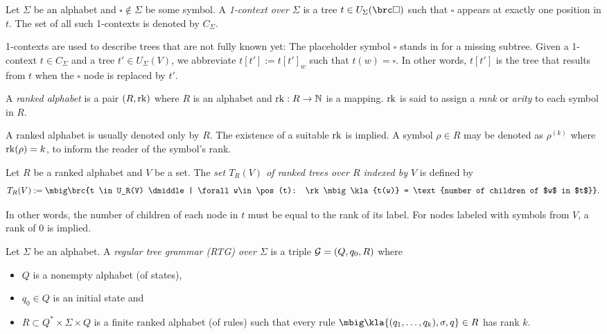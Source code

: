 \begin{definition}
 Let $\Sigma$ be an alphabet and $\square\notin\Sigma$ be some symbol. A
 \emph{1-context over $\Sigma$} is a tree $t\in U_\Sigma(\brc\square)$ such
 that $\square$ appears at exactly one position in $t$. The set of all such
 1-contexts is denoted by $C_\Sigma$.
\end{definition}

1-contexts are used to describe trees that are not fully known yet: The
placeholder symbol $\square$ stands in for a missing subtree. Given a 1-context
$t\in C_\Sigma$ and a tree $t'\in U_\Sigma(V)$, we abbreviate $t[t'] :=
t[t']_w$ such that $t(w) = \square$. In other words, $t[t']$ is the tree that
results from $t$ when the $\square$ node is replaced by $t'$.

\begin{definition}
 A \emph{ranked alphabet} is a pair $(R,\operatorname{rk})$ where $R$ is an alphabet and
 $\operatorname{rk}:R\to\mathbb N$ is a mapping. $\operatorname{rk}$ is said to assign a \emph{rank} or
 \emph{arity} to each symbol in $R$.
\end{definition}

A ranked alphabet is usually denoted only by $R$. The existence of a suitable
$\operatorname{rk}$ is implied. A symbol $\rho\in R$ may be denoted as $\rho^{(k)}$ where
$\operatorname{rk}(\rho) = k$, to inform the reader of the symbol's rank.

\begin{definition}
 Let $R$ be a ranked alphabet and $V$ be a set. The \emph{set $T_R(V)$ of
 ranked trees over $R$ indexed by $V$} is defined by
 \[
  T_R(V) := \mbig\brc{t \in U_R(V) \dmiddle| \forall w\in\pos(t): \rk\mbig\kla{t(w)} = \text{number of children of $w$ in $t$}}.
 \]
\end{definition}

In other words, the number of children of each node in $t$ must be equal to the
rank of its label. For nodes labeled with symbols from $V$, a rank of 0 is
implied.

\begin{definition}
 Let $\Sigma$ be an alphabet. A \emph{regular tree grammar (RTG) over $\Sigma$} is a
 triple $\mathcal G = (Q,q_0,R)$ where
 \begin{itemize}\setlength\itemsep{-0.3em}
  \item $Q$ is a nonempty alphabet (of states),
  \item $q_0\in Q$ is an initial state and
  \item $R\subset Q^*\times\Sigma\times Q$ is a finite ranked alphabet (of
   rules) such that every rule $\mbig\kla{(q_1,\ldots,q_k),\sigma,q}\in R$ has
   rank $k$.
 \end{itemize}
\end{definition}

